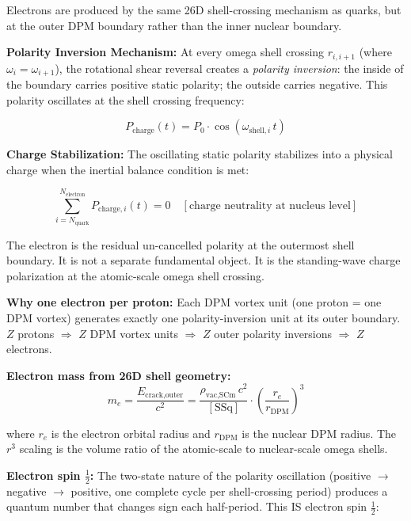 \documentclass[12pt,a4paper]{article}
\begin{document}
Electrons are produced by the same 26D shell-crossing mechanism as quarks,
but at the outer DPM boundary rather than the inner nuclear boundary.

\noindent\textbf{Polarity Inversion Mechanism:}
At every omega shell crossing $r_{i,i+1}$ (where $\omega_i = \omega_{i+1}$), the
rotational shear reversal creates a \emph{polarity inversion}: the inside of the
boundary carries positive static polarity; the outside carries negative.
This polarity oscillates at the shell crossing frequency:

\begin{equation}
  P_{\text{charge}}(t) = P_0 \cdot \cos(\omega_{\text{shell},i}\,t)
  \label{eq:polarity_oscillation}
\end{equation}

\noindent\textbf{Charge Stabilization:}
The oscillating static polarity stabilizes into a physical charge when the
inertial balance condition is met:

\begin{equation}
  \sum_{i=N_{\text{quark}}}^{N_{\text{electron}}} P_{\text{charge},i}(t) = 0
  \quad [\text{charge neutrality at nucleus level}]
  \label{eq:charge_balance}
\end{equation}

The electron is the residual un-cancelled polarity at the outermost shell boundary.
It is not a separate fundamental object.  It is the standing-wave charge
polarization at the atomic-scale omega shell crossing.

\noindent\textbf{Why one electron per proton:}
Each DPM vortex unit (one proton = one DPM vortex) generates exactly one
polarity-inversion unit at its outer boundary.
$Z$ protons $\Rightarrow$ $Z$ DPM vortex units $\Rightarrow$ $Z$ outer polarity
inversions $\Rightarrow$ $Z$ electrons.

\noindent\textbf{Electron mass from 26D shell geometry:}
\begin{equation}
  m_e = \frac{E_{\text{crack,outer}}}{c^2}
    = \frac{\rho_{\text{vac,SCm}}\,c^2}{[\text{SSq}]}\cdot
      \left(\frac{r_e}{r_{\text{DPM}}}\right)^3
  \label{eq:electron_mass}
\end{equation}

where $r_e$ is the electron orbital radius and $r_{\text{DPM}}$ is the nuclear DPM
radius.  The $r^3$ scaling is the volume ratio of the atomic-scale to nuclear-scale
omega shells.

\noindent\textbf{Electron spin $\frac{1}{2}$:}
The two-state nature of the polarity oscillation (positive $\to$ negative $\to$
positive, one complete cycle per shell-crossing period) produces a quantum number
that changes sign each half-period.  This IS electron spin $\frac{1}{2}$:
\end{document}
